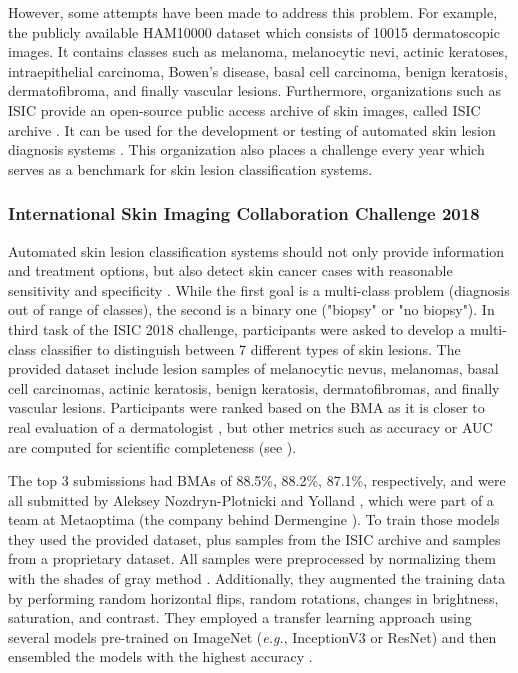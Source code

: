     However, some attempts have been made to address this problem. For example, the publicly available \ac{HAM10000} dataset \cite{ham10000} which consists of 10015 dermatoscopic images. It contains classes such as melanoma, melanocytic nevi, actinic keratoses, intraepithelial carcinoma, Bowen's disease, basal cell carcinoma, benign keratosis, dermatofibroma, and finally vascular lesions. Furthermore, organizations such as \ac{ISIC} provide an open-source public access archive of skin images, called \ac{ISIC} archive \cite{archive}. It can be used for the development or testing of automated skin lesion diagnosis systems \cite{isic2019}. This organization also places a challenge every year which serves as a benchmark for skin lesion classification systems. \par
    
    \subsubsection{International Skin Imaging Collaboration Challenge 2018}

    Automated skin lesion classification systems should not only provide information and treatment options, but also detect skin cancer cases with reasonable sensitivity and specificity \cite{isic2018}. While the first goal is a multi-class problem (diagnosis out of range of classes), the second is a binary one ("biopsy" or "no biopsy"). In third task of the \ac{ISIC} 2018 challenge, participants were asked to develop a multi-class classifier to distinguish between 7 different types of skin lesions. The provided dataset include lesion samples of melanocytic nevus, melanomas, basal cell carcinomas, actinic keratosis, benign keratosis, dermatofibromas, and finally vascular lesions. Participants were ranked based on the \ac{BMA} as it is closer to real evaluation of a dermatologist \cite{isic2018}, but other metrics such as accuracy or \ac{AUC} are computed for scientific completeness (see ). \par 
    
    The top 3 submissions had \ac{BMA}s of 88.5\%, 88.2\%, 87.1\%, respectively, and were all submitted by Aleksey Nozdryn-Plotnicki and Yolland \cite{isic2018top3}, which were part of a team at Metaoptima (the company behind Dermengine \cite{dermengine}). To train those models they used the provided dataset, plus samples from the \ac{ISIC} archive and samples from a proprietary dataset. All samples were preprocessed by normalizing them with the shades of gray method \cite{shadesgray}. Additionally, they augmented the training data by performing random horizontal flips, random rotations, changes in brightness, saturation, and contrast. They employed a transfer learning approach using several models pre-trained on ImageNet (\textit{e.g.}, InceptionV3 or ResNet) and then ensembled the models with the highest accuracy \cite{isic2018top3}. \par
    
